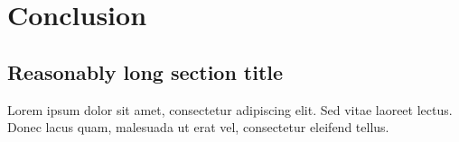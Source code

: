 
\chapter{Conclusion}

\ifpdf
    \graphicspath{{chapter6/figs/raster/}{chapter6/figs/PDF/}{chapter6/figs/}}
\else
    \graphicspath{{chapter6/figs/vector/}{chapter6/figs/}}
\fi


\section[Short title]{Reasonably long section title}

Lorem ipsum dolor sit amet, consectetur adipiscing elit. Sed vitae laoreet lectus.
Donec lacus quam, malesuada ut erat vel, consectetur eleifend tellus.
